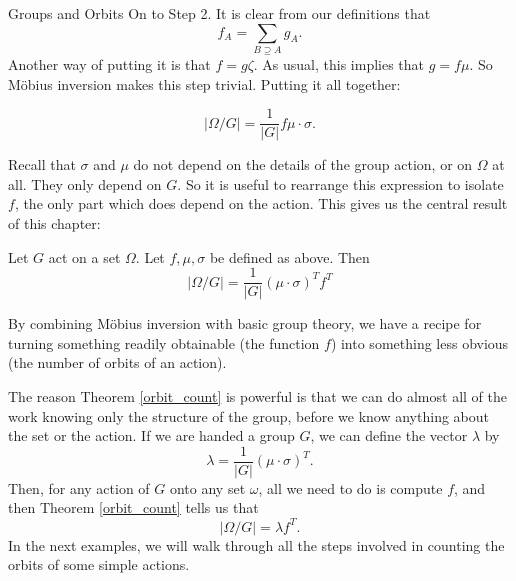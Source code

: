 \documentclass[12pt]{pom_thesis}
\begin{document}
\begin{chapter}{Groups and Orbits}
On to Step 2. It is clear from our definitions that \[f_A = \sum_{B \supseteq A} g_A.\] Another way of putting it is that $f = g\zeta$. As usual, this implies that $g = f\mu$. So M\"obius inversion makes this step trivial. Putting it all together:

\[|\Omega/G| = \frac {1}{|G|}f\mu \cdot \sigma.\]

Recall that $\sigma$ and $\mu$ do not depend on the details of the group action, or on $\Omega$ at all. They only depend on $G$. So it is useful to rearrange this expression to isolate $f$, the only part which does depend on the action. This gives us the central result of this chapter:
\begin{thm}\label{orbit_count}
Let $G$ act on a set $\Omega$. Let $f, \mu, \sigma$ be defined as above. Then
\[
|\Omega/G| = \frac {1}{|G|}(\mu \cdot \sigma)^Tf^T
\]
\end{thm}

By combining M\"obius inversion with basic group theory, we have a recipe for turning something readily obtainable (the function $f$) into something less obvious (the number of orbits of an action).

The reason Theorem \ref{orbit_count} is powerful is that we can do almost all of the work knowing only the structure of the group, before we know anything about the set or the action. If we are handed a group $G$, we can define the vector $\lambda$ by
\begin{equation}\label{eq:lambda}
\lambda = \frac {1}{|G|}(\mu \cdot \sigma)^T.
\end{equation}
Then, for any action of $G$ onto any set $\omega$, all we need to do is compute $f$, and then Theorem \ref{orbit_count} tells us that
\[
|\Omega/G| = \lambda f^T.
\]
In the next examples, we will walk through all the steps involved in counting the orbits of some simple actions.


\end{chapter}
\end{document}
